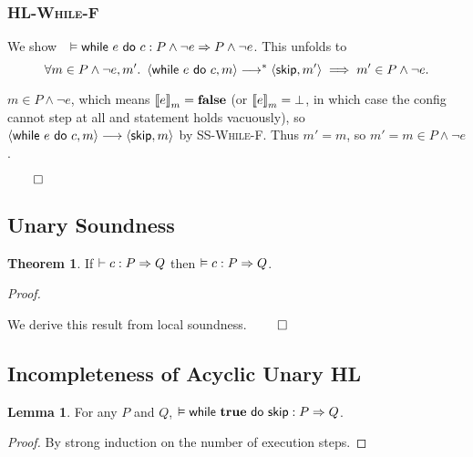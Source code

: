 \documentclass[10pt]{article}
\theoremstyle{definition}
\newtheorem{theorem}{Theorem}
\newtheorem{lemma}{Lemma}
\begin{document}
\subsubsection*{\textsc{HL-While-F}}
We show~~$\VAL \Triple \While e do c : P \wedge \neg e => P \wedge \neg e$.
This unfolds to
$$\forall m \in P \wedge \neg e, m'.\
\Cfg(\While e do c,m) \sstepstotrans \Cfg(\Skip,m') \implies
m' \in P \wedge \neg e.$$

$m \in P \wedge \neg e$, which means $\Eval(e,m) = \False$
(or $\Eval(e,m) = \bot$, in which case the config cannot step at all and statement holds vacuously),
so $\Cfg(\While e do c,m) \sstepsto \Cfg(\Skip,m)$ by \textsc{SS-While-F}.
Thus $m' = m$, so $m' = m \in P \wedge \neg e$.


\hfill $\qed$

\subsection*{Unary Soundness}
\begin{theorem}
If $\DER \Triple c : P => Q$ then $\VAL \Triple c : P => Q$.
\end{theorem}

\noindent
\emph{Proof.}

\noindent
We derive this result from local soundness.
\hfill $\qed$


\subsection{Incompleteness of Acyclic Unary HL}

\begin{lemma}
    For any $P$ and $Q$,
    $\VAL \Triple {\While {\True} do {\Skip} } : P => Q$.
\end{lemma}
\begin{proof}
    By strong induction on the number of execution steps.
\end{proof}
\end{document}
